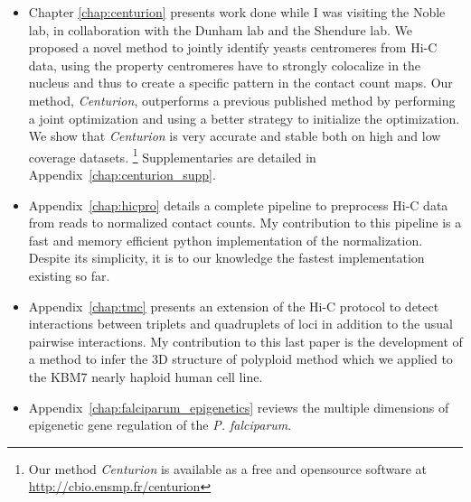 \begin{itemize}
\item Chapter \ref{chap:centurion} presents work done while I was visiting
the Noble lab, in collaboration with the Dunham lab and the Shendure lab. We proposed a
novel method to jointly identify yeasts centromeres from Hi-C data, using the
property centromeres have to strongly colocalize in the nucleus and thus to
create a specific pattern in the contact count maps. Our method,
\textit{Centurion}, outperforms a previous published method by performing a
joint optimization and using a better strategy to initialize the optimization.
We show that \textit{Centurion} is very accurate and stable both on high and
low coverage datasets. \footnote{Our method \textit{Centurion} is available as
a free and opensource software at \url{http://cbio.ensmp.fr/centurion}}
Supplementaries are detailed in Appendix~\ref{chap:centurion_supp}.

\item Appendix~\ref{chap:hicpro} details a complete pipeline to preprocess
Hi-C data from reads to normalized contact counts. My contribution to this
pipeline is a fast and memory efficient python implementation of the
normalization. Despite its simplicity, it is to our knowledge the fastest
implementation existing so far.

\item Appendix~\ref{chap:tmc} presents an extension of  the Hi-C protocol to
detect interactions between triplets and quadruplets of loci in addition to
the usual pairwise interactions. My contribution to this last paper is the
development of a method to infer the 3D structure of polyploid method which we
applied to the KBM7 nearly haploid human cell line.

\item Appendix~\ref{chap:falciparum_epigenetics} reviews the multiple
dimensions of epigenetic gene regulation of the {\em P. falciparum}.

\end{itemize}
